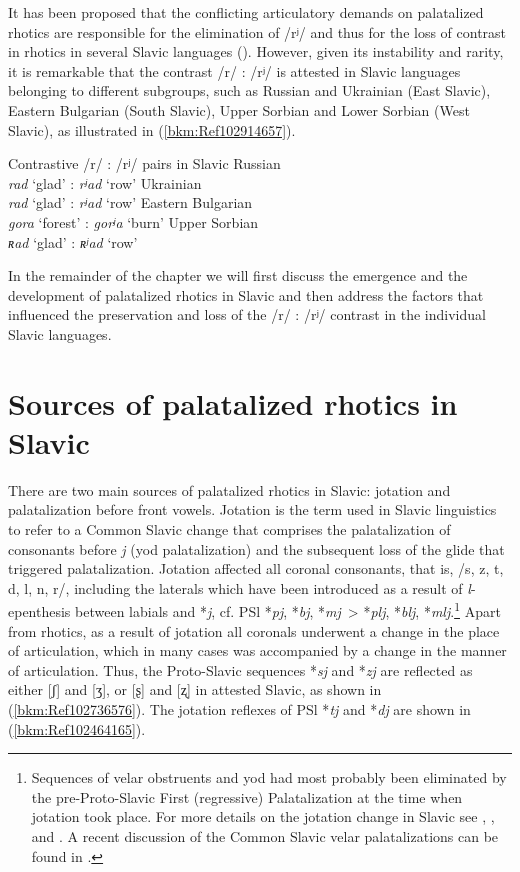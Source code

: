 \documentclass[output=paper]{langscibook}
\begin{document}
It has been proposed that the conflicting articulatory demands on palatalized rhotics are responsible for the elimination of /rʲ/ and thus for the loss of contrast in rhotics in several Slavic languages (\citealt{KavitskayaEtAl2009,Jaworski2018}). However, given its instability and rarity, it is remarkable that the contrast /r/ : /rʲ/ is attested in Slavic languages belonging to different subgroups, such as Russian and Ukrainian (East Slavic), Eastern Bulgarian (South Slavic), Upper Sorbian and Lower Sorbian (West Slavic), as illustrated in (\ref{bkm:Ref102914657}).


\ea \label{bkm:Ref102914657}Contrastive /r/ : /rʲ/ pairs in Slavic
  \ea Russian\\
      \textit{rad}   ‘glad’  :  \textit{rʲad}   ‘row’
  \ex Ukrainian\\
      \textit{rad}   ‘glad’  :  \textit{rʲad}   ‘row’
  \ex Eastern Bulgarian\\
      \textit{gora}   ‘forest’  :  \textit{gorʲa}   ‘burn’
  \ex Upper Sorbian\\
      \textit{ʀad}   ‘glad’  :  \textit{ʀʲad}   ‘row’
  \z
\z

In the remainder of the chapter we will first discuss the emergence and the development of palatalized rhotics in Slavic and then address the factors that influenced the preservation and loss of the /r/ : /rʲ/ contrast in the individual Slavic languages.

\section{Sources of palatalized rhotics in Slavic}
\label{sec:kavitskaya:3}
There are two main sources of palatalized rhotics in Slavic: jotation and palatalization before front vowels. Jotation is the term used in Slavic linguistics to refer to a Common Slavic change that comprises the palatalization of consonants before \textit{j} (yod palatalization) and the subsequent loss of the glide that triggered palatalization. Jotation affected all coronal consonants, that is, /s, z, t, d, l, n, r/, including the laterals which have been introduced as a result of \textit{l}{}-epenthesis between labials and *\textit{j}, cf. PSl *\textit{pj}, *\textit{bj}, *\textit{mj}~> *\textit{plj}, *\textit{blj}, *\textit{mlj}.\footnote{Sequences of velar obstruents and yod had most probably been eliminated by the pre-Proto-Slavic First (regressive) Palatalization at the time when jotation took place. For more details on the jotation change in Slavic see \citet{Shevelov1964}, \citet[112-115]{Carlton1991}, and \citet{WandlKavitskaya2023}. A recent discussion of the Common Slavic velar palatalizations can be found in \citet{Wandl2020}.} Apart from rhotics, as a result of jotation all coronals underwent a change in the place of articulation, which in many cases was accompanied by a change in the manner of articulation. Thus, the Proto-Slavic sequences *\textit{sj} and *\textit{zj} are reflected as either [ʃ] and [ʒ], or [ʂ] and [ʐ] in attested Slavic, as shown in (\ref{bkm:Ref102736576}). The jotation reflexes of PSl *\textit{tj} and *\textit{dj} are shown in (\ref{bkm:Ref102464165}).
\end{document}
